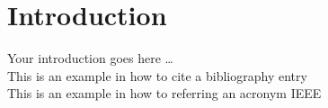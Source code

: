 

\section{Introduction}
\label{sec:introduction}
Your introduction goes here \ldots \\

This is an example in how to cite a bibliography entry \cite{johndoe} \\

This is an example in how to referring an acronym \gls{IEEE}
